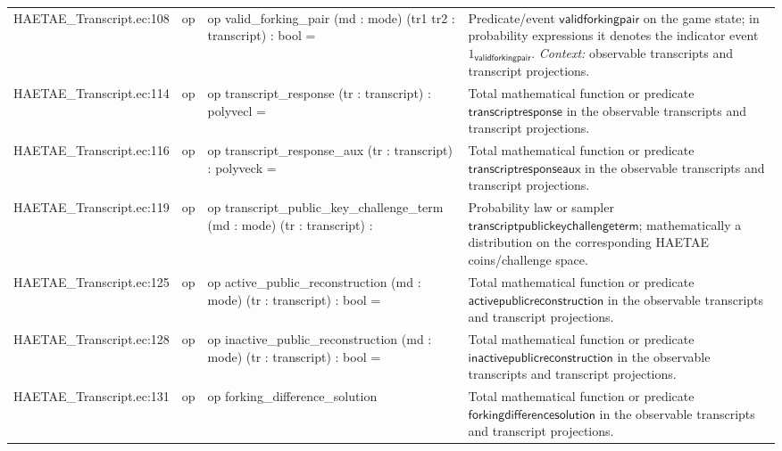 \documentclass[10pt]{article}
\begin{document}
\begin{longtable}{L{0.11\textwidth}L{0.055\textwidth}L{0.385\textwidth}L{0.41\textwidth}}
HAETAE\_\allowbreak{}Transcript.\allowbreak{}ec:\allowbreak{}108 & op & {\ttfamily\scriptsize op valid\_\allowbreak{}forking\_\allowbreak{}pair (md : mode) (tr1 tr2 : transcript) : bool =} & Predicate/event $\mathsf{validforkingpair}$ on the game state; in probability expressions it denotes the indicator event $1_{\mathsf{validforkingpair}}$. \emph{Context:} observable transcripts and transcript projections. \\
HAETAE\_\allowbreak{}Transcript.\allowbreak{}ec:\allowbreak{}114 & op & {\ttfamily\scriptsize op transcript\_\allowbreak{}response (tr : transcript) : polyvecl =} & Total mathematical function or predicate $\mathsf{transcriptresponse}$ in the observable transcripts and transcript projections. \\
HAETAE\_\allowbreak{}Transcript.\allowbreak{}ec:\allowbreak{}116 & op & {\ttfamily\scriptsize op transcript\_\allowbreak{}response\_\allowbreak{}aux (tr : transcript) : polyveck =} & Total mathematical function or predicate $\mathsf{transcriptresponseaux}$ in the observable transcripts and transcript projections. \\
HAETAE\_\allowbreak{}Transcript.\allowbreak{}ec:\allowbreak{}119 & op & {\ttfamily\scriptsize op transcript\_\allowbreak{}public\_\allowbreak{}key\_\allowbreak{}challenge\_\allowbreak{}term (md : mode) (tr : transcript) :} & Probability law or sampler $\mathsf{transcriptpublickeychallengeterm}$; mathematically a distribution on the corresponding HAETAE coins/challenge space. \\
HAETAE\_\allowbreak{}Transcript.\allowbreak{}ec:\allowbreak{}125 & op & {\ttfamily\scriptsize op active\_\allowbreak{}public\_\allowbreak{}reconstruction (md : mode) (tr : transcript) : bool =} & Total mathematical function or predicate $\mathsf{activepublicreconstruction}$ in the observable transcripts and transcript projections. \\
HAETAE\_\allowbreak{}Transcript.\allowbreak{}ec:\allowbreak{}128 & op & {\ttfamily\scriptsize op inactive\_\allowbreak{}public\_\allowbreak{}reconstruction (md : mode) (tr : transcript) : bool =} & Total mathematical function or predicate $\mathsf{inactivepublicreconstruction}$ in the observable transcripts and transcript projections. \\
HAETAE\_\allowbreak{}Transcript.\allowbreak{}ec:\allowbreak{}131 & op & {\ttfamily\scriptsize op forking\_\allowbreak{}difference\_\allowbreak{}solution} & Total mathematical function or predicate $\mathsf{forkingdifferencesolution}$ in the observable transcripts and transcript projections. \\

\end{longtable}
\end{document}
